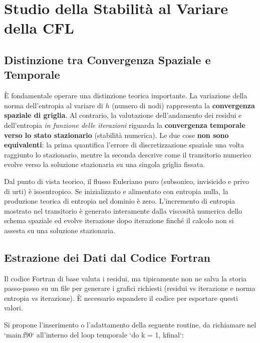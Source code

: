 \section{Studio della Stabilità al Variare della CFL}

\subsection{Distinzione tra Convergenza Spaziale e Temporale}
È fondamentale operare una distinzione teorica importante. La variazione della norma dell'entropia al variare di $h$ (numero di nodi) rappresenta la \textbf{convergenza spaziale di griglia}. Al contrario, la valutazione dell'andamento dei residui e dell'entropia \textit{in funzione delle iterazioni} riguarda la \textbf{convergenza temporale verso lo stato stazionario} (stabilità numerica). Le due cose \textbf{non sono equivalenti}: la prima quantifica l'errore di discretizzazione spaziale una volta raggiunto lo stazionario, mentre la seconda descrive come il transitorio numerico evolve verso la soluzione stazionaria su una singola griglia fissata.

Dal punto di vista teorico, il flusso Euleriano puro (subsonico, invisicido e privo di urti) è isoentropico. Se inizializzato e alimentato con entropia nulla, la produzione teorica di entropia nel dominio è zero. L'incremento di entropia mostrato nel transitorio è generato interamente dalla viscosità numerica dello schema spaziale ed evolve iterazione dopo iterazione finché il calcolo non si assesta su una soluzione stazionaria.

\subsection{Estrazione dei Dati dal Codice Fortran}
Il codice Fortran di base valuta i residui, ma tipicamente non ne salva la storia passo-passo su un file per generare i grafici richiesti (residui vs iterazione e norma entropia vs iterazione). È necessario espandere il codice per esportare questi valori.

Si propone l'inserimento o l'adattamento della seguente routine, da richiamare nel `main.f90` all'interno del loop temporale `do k = 1, kfinal`:

